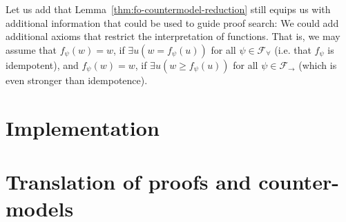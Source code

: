 \documentclass[a4paper,12pt]{report}
\theoremstyle{definition}
\theoremstyle{definition}
\theoremstyle{definition}
\theoremstyle{definition}
\theoremstyle{definition}
\theoremstyle{definition}
\theoremstyle{definition}
\begin{document}
	Let us add that Lemma~\ref{thm:fo-countermodel-reduction} still equips us with additional information that could be used to guide proof search: We could add additional axioms that restrict the interpretation of functions. That is, we may assume that $f_\psi(w) = w$, if $\exists u(w = f_\psi(u))$ for all $\psi\in\mathcal F_\forall$ (i.e. that $f_\psi$ is idempotent), and $f_\psi(w) = w$, if $\exists u(w \geq f_\psi(u))$ for all $\psi\in\mathcal F_\to$ (which is even stronger than idempotence).
	
	\chapter{Implementation}
	
	\chapter{Translation of proofs and counter-models}	


		
	
	
	
	
\end{document}
